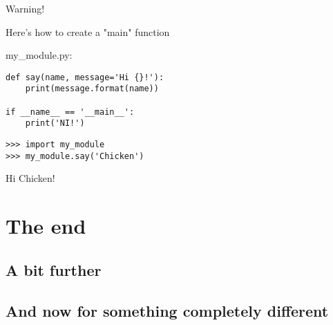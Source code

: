 \documentclass[ignorenonframetext,]{beamer}
\begin{document}
\begin{frame}[fragile]{Warning!}

    Here's how to create a "main" function

    my\_module.py:
    \begin{tcolorbox}
        \begin{verbatim}
def say(name, message='Hi {}!'):
    print(message.format(name))

if __name__ == '__main__':
    print('NI!')
        \end{verbatim}
    \end{tcolorbox}

    \begin{tcolorbox}
        \begin{verbatim}
>>> import my_module
>>> my_module.say('Chicken')
        \end{verbatim}
Hi Chicken!
    \end{tcolorbox}
\end{frame}

\section{The end}
\subsection{A bit further}
\subsection{And now for something completely different}
\end{document}
